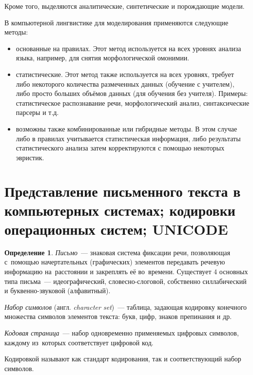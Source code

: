 \documentclass[12pt]{article}
\theoremstyle{definition}
\newtheorem*{defn}{Определение}
\theoremstyle{remark}
\numberwithin{equation}{section}
\begin{document}
Кроме того, выделяются аналитические, синтетические и порождающие модели.

В компьютерной лингвистике для моделирования применяются следующие методы:
\begin{itemize}
	\item основанные на правилах. Этот метод используется на всех уровнях анализа языка, например, для снятия морфологической омонимии.
	\item статистические. Этот метод также используется на всех уровнях, требует либо некоторого количества размеченных данных (обучение с учителем), либо просто больших объёмов данных (для обучения без учителя). Примеры: статистическое распознавание речи, морфологический анализ, синтаксические парсеры и т.д.
	\item возможны также комбинированные или гибридные методы. В этом случае либо в правилах учитывается статистическая информация, либо результаты статистического анализа затем корректируются с помощью некоторых эвристик.
\end{itemize}

\section{Представление письменного текста в компьютерных системах; кодировки операционных систем; UNICODE}
\begin{defn}
\textsl{Письмо}~--- знаковая система фиксации речи, позволяющая с~помощью
начертательных (графических) элементов передавать речевую информацию
на~расстоянии и закреплять её во~времени. Существует 4 основных типа
письма~--- идеографический, словесно-слоговой, собственно силлабический
и буквенно-звуковой (алфавитный).

{\sl Набор символов} (англ. {\sl character set})~--- таблица, задающая
кодировку конечного множества символов элементов текста: букв, цифр,
знаков препинания и др.

{\sl Кодовая страница}~--- набор одновременно применяемых цифровых символов,
каждому из~которых соответствует цифровой код.
\end{defn}

Кодировкой называют как стандарт кодирования, так и соответствующий набор
символов.
\end{document}
